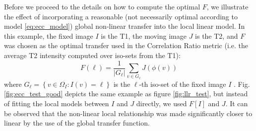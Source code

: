 Before we proceed to the details on how to compute the optimal $F$, we illustrate the effect of incorporating a reasonable (not necessarily optimal according to model \eqref{eq:ecc_model}) global non-linear transfer into the local linear model. In this example, the fixed image $I$ is the T1, the moving image $J$ is the T2, and $F$ was chosen as the optimal transfer used in the Correlation Ratio metric (i.e. the average T2 intensity computed over iso-sets from the T1):
\begin{equation}\label{eq:cr_transfer}
    F(\ell) = \frac{1}{|G_{\ell}|}\sum_{v \in G_{\ell}} J(\phi(v))
\end{equation}
where $G_{\ell} = \left\lbrace v\in\Omega_{I}: I(v)=\ell\right\rbrace$ is the $\ell$-th iso-set of the fixed image $I$ . Fig. \ref{fig:ecc_test_good} depicts the same example as figure \ref{fig:llr_test}, but instead of fitting the local models between $I$ and $J$ directly, we used $F[I]$ and $J$. It can be observed that the non-linear local relationship was made significantly closer to linear by the use of the global transfer function.\\





